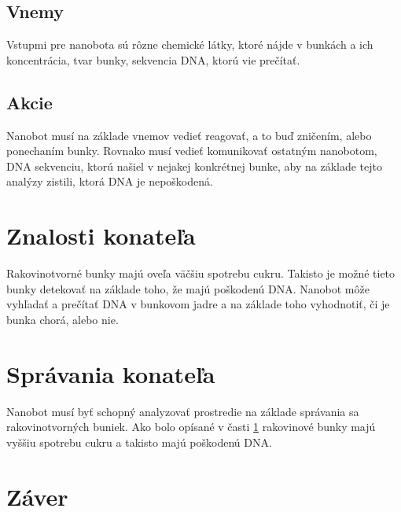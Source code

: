 \documentclass[10pt,twoside,slovak,a4paper]{article}
\begin{document}
\subsection{Vnemy}
Vstupmi pre nanobota sú rôzne chemické látky, ktoré nájde v bunkách a ich koncentrácia, tvar bunky, sekvencia DNA, ktorú vie prečítať.

\subsection{Akcie}
Nanobot musí na základe vnemov vedieť reagovať, a to buď zničením, alebo ponechaním bunky. Rovnako musí vedieť komunikovať ostatným nanobotom, DNA sekvenciu, ktorú našiel v nejakej konkrétnej bunke, aby na základe tejto analýzy zistili, ktorá DNA je nepoškodená.


\section{Znalosti konateľa}
\label{sec:znalosti}
Rakovinotvorné bunky majú oveľa väčšiu spotrebu cukru. Takisto je možné tieto bunky detekovať na základe toho, že majú poškodenú DNA. Nanobot môže vyhľadať a prečítať DNA v bunkovom jadre a na základe toho vyhodnotiť, či je bunka chorá, alebo nie.\cite{Wikipedia-nador,cancer-cell-metabolism}

\section{Správania konateľa}
Nanobot musí byť schopný analyzovať prostredie na základe správania sa rakovinotvorných buniek. Ako bolo opísané v časti \ref{sec:znalosti} rakovinové bunky majú vyššiu spotrebu cukru a takisto majú poškodenú DNA.

\section{Záver}

\listoffigures


\end{document}
